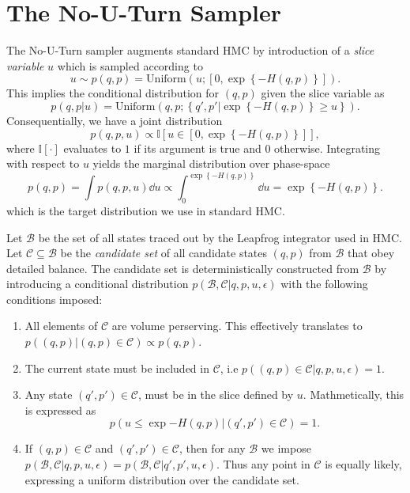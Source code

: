 \section{The No-U-Turn Sampler}
The No-U-Turn sampler augments standard HMC by introduction of a \textit{slice variable} $u$ which is sampled according to
\begin{equation}
    u \sim p(q, p) = \text{Uniform}\left(u; \left[0, \exp\left\{-H(q, p)\right\}\right]\right).
\end{equation} 
This implies the conditional distribution for $(q, p)$ given the slice variable as
\begin{equation}
    p(q, p|u) = \text{Uniform}\left( q, p; \left\{q', p' \bigg| \exp\left\{-H(q, p)\right\} \geq u \right\} \right).
\end{equation}
Consequentially, we have a joint distribution 
\begin{equation}
    p(q, p, u) \propto \mathbb{I}\left[u \in \left[0, \exp\left\{-H(q, p)\right\}\right]\right],
\end{equation}
where $\mathbb{I}[\cdot]$ evaluates to $1$ if its argument is true and $0$ otherwise. 
Integrating with respect to $u$ yields the marginal distribution
over phase-space
\begin{equation}
    p(q, p) = \int p(q, p, u) \dd u \propto \int_0^{\exp\left\{-H(q, p)\right\}}\dd u = \exp\left\{-H(q, p)\right\}.
\end{equation}
which is the target distribution we use in standard HMC.

Let $\mathcal{B}$ be the set of all states traced out by the Leapfrog integrator used in HMC. Let $\mathcal{C} \subseteq \mathcal{B}$ be 
the \textit{candidate set} of all candidate states $(q, p)$ from $\mathcal{B}$ that obey detailed balance. The candidate set is deterministically constructed from $\mathcal{B}$ by introducing a conditional distribution $p(\mathcal{B}, \mathcal{C}|q, p, u, \epsilon)$ with the following conditions imposed:
\begin{enumerate}
    \item All elements of $\mathcal{C}$ are volume perserving. This effectively translates to $p((q, p)|(q, p) \in \mathcal{C}) \propto p(q, p)$.
    \item The current state must be included in $\mathcal{C}$, i.e $p\left((q, p) \in \mathcal{C}|q, p, u, \epsilon\right) = 1$.
    \item Any state $(q', p') \in \mathcal{C}$, must be in the slice defined by $u$. 
    Mathmetically, this is expressed as $$p\left(u\leq \exp{-H(q, p)}\bigg|(q', p') \in \mathcal{C}\right) = 1.$$
    \item If $(q, p) \in \mathcal{C}$ and $(q', p') \in \mathcal{C}$, then for any $\mathcal{B}$ we impose 
    $p(\mathcal{B}, \mathcal{C}|q, p, u, \epsilon) = p(\mathcal{B}, \mathcal{C}|q', p', u, \epsilon)$.
    Thus any point in $\mathcal{C}$ is equally likely, expressing a uniform distribution over the candidate set.
\end{enumerate}


